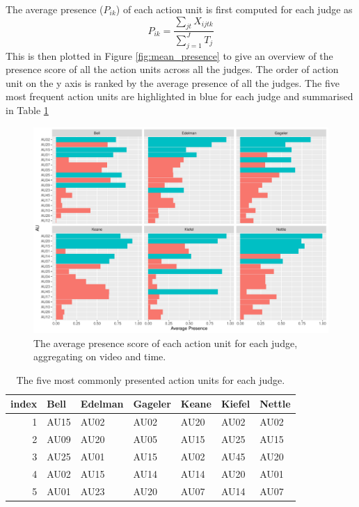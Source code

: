 \documentclass{monashthesis}
\begin{document}
The average presence (\(P_{ik}\)) of each action unit is first computed for each judge as \[P_{ik} = \frac{\sum_{jt}X_{ijtk}}{\sum_{j = 1}^JT_j}\] This is then plotted in Figure \ref{fig:mean_presence} to give an overview of the presence score of all the action units across all the judges. The order of action unit on the y axis is ranked by the average presence of all the judges. The five most frequent action units are highlighted in blue for each judge and summarised in Table \ref{tab:most_common}

\begin{figure}

{\centering \includegraphics[width=1\linewidth]{figures/unnamed-chunk-4-1} 

}

\caption{The average presence score of each action unit for each judge, aggregating on video and time. \label{fig:mean_presence}}\label{fig:unnamed-chunk-4}
\end{figure}

\begin{table}

\caption{\label{tab:unnamed-chunk-5}\label{tab:most_common}The five most commonly presented action units for each judge.}
\centering
\begin{tabular}[t]{r|l|l|l|l|l|l}
\hline
index & Bell & Edelman & Gageler & Keane & Kiefel & Nettle\\
\hline
1 & AU15 & AU02 & AU02 & AU20 & AU02 & AU02\\
\hline
2 & AU09 & AU20 & AU05 & AU15 & AU25 & AU15\\
\hline
3 & AU25 & AU01 & AU15 & AU02 & AU45 & AU20\\
\hline
4 & AU02 & AU15 & AU14 & AU14 & AU20 & AU01\\
\hline
5 & AU01 & AU23 & AU20 & AU07 & AU14 & AU07\\
\hline
\end{tabular}
\end{table}
\end{document}
